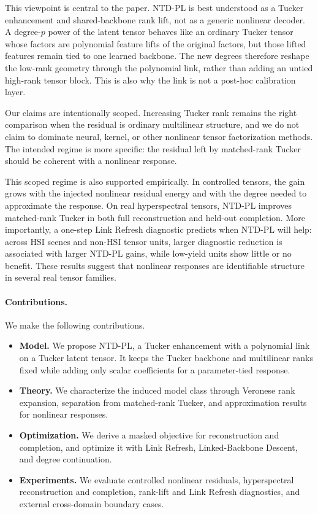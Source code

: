This viewpoint is central to the paper. NTD-PL is best understood as a Tucker
enhancement and shared-backbone rank lift, not as a generic nonlinear decoder. A
degree-\(p\) power of the latent tensor behaves like an ordinary Tucker tensor
whose factors are polynomial feature lifts of the original factors, but those
lifted features remain tied to one learned backbone. The new degrees therefore
reshape the low-rank geometry through the polynomial link, rather than
adding an untied high-rank tensor block. This is also why the link is not a
post-hoc calibration layer.

Our claims are intentionally scoped. Increasing Tucker rank remains the right
comparison when the residual is ordinary multilinear structure, and we do not
claim to dominate neural, kernel, or other nonlinear tensor factorization
methods. The intended regime is more specific: the residual left by
matched-rank Tucker should be coherent with a nonlinear response.

This scoped regime is also supported empirically. In controlled tensors, the gain grows with the injected nonlinear residual energy and with the degree needed to approximate the response. On real hyperspectral tensors, NTD-PL improves matched-rank Tucker in both full reconstruction and held-out completion. More importantly, a one-step Link Refresh diagnostic predicts when NTD-PL will help: across HSI scenes and non-HSI tensor units, larger diagnostic reduction is associated with larger NTD-PL gains, while low-yield units show little or no benefit. These results suggest that nonlinear responses are identifiable structure in several real tensor families.

\paragraph{Contributions.}
We make the following contributions.
\begin{itemize}[leftmargin=*,itemsep=2pt,topsep=2pt]
  \item \textbf{Model.} We propose NTD-PL, a Tucker enhancement with a
  polynomial link on a Tucker latent tensor. It keeps the Tucker
  backbone and multilinear ranks fixed while adding only scalar coefficients
  for a parameter-tied response.
  \item \textbf{Theory.} We characterize the induced model class through
  Veronese rank expansion, separation from matched-rank Tucker, and
  approximation results for nonlinear responses.
  \item \textbf{Optimization.} We derive a masked objective for reconstruction
  and completion, and optimize it with Link Refresh, Linked-Backbone Descent,
  and degree continuation.
  \item \textbf{Experiments.} We evaluate controlled nonlinear residuals,
  hyperspectral reconstruction and completion, rank-lift and Link Refresh
  diagnostics, and external cross-domain boundary cases.
\end{itemize}
